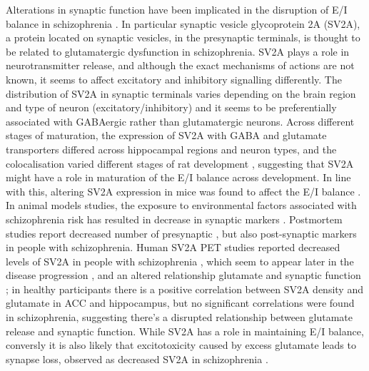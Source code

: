 \documentclass[
  letterpaper,
  DIV=11,
  numbers=noendperiod]{scrartcl}
\begin{document}
Alterations in synaptic function have been implicated in the disruption
of E/I balance in schizophrenia \autocite{howes_synaptic_2023}. In
particular synaptic vesicle glycoprotein 2A (SV2A), a protein located on
synaptic vesicles, in the presynaptic terminals, is thought to be
related to glutamatergic dysfunction in schizophrenia. SV2A plays a role
in neurotransmitter release, and although the exact mechanisms of
actions are not known, it seems to affect excitatory and inhibitory
signalling differently. The distribution of SV2A in synaptic terminals
varies depending on the brain region and type of neuron
(excitatory/inhibitory)\autocite{vanoye-carlo_differential_2019,wong_sv2a_2024}
and it seems to be preferentially associated with GABAergic rather than
glutamatergic neurons\autocite{mendoza-torreblanca_analysis_2019}.
Across different stages of maturation, the expression of SV2A with GABA
and glutamate transporters differed across hippocampal regions and
neuron types, and the colocalisation varied different stages of rat
development \autocite{vanoye-carlo_differential_2019}, suggesting that
SV2A might have a role in maturation of the E/I balance across
development. In line with this, altering SV2A expression in mice was
found to affect the E/I balance \autocite{venkatesan_altered_2012}. In
animal models studies, the exposure to environmental factors associated
with schizophrenia risk has resulted in decrease in synaptic markers
\autocite{silva-gomez_decreased_2003}. Postmortem studies report
decreased number of presynaptic \autocite{osimo_synaptic_2019}, but also
post-synaptic \autocite{berdenisvanberlekom_synapse_2019} markers in
people with schizophrenia. Human SV2A PET studies reported decreased
levels of SV2A in people with schizophrenia
\autocite{radhakrishnan_vivo_2021,onwordi_synaptic_2020}, which seem to
appear later in the disease progression
\autocite{onwordi_synaptic_2024}, and an altered relationship glutamate
and synaptic function \autocite{onwordi_relationship_2021}; in healthy
participants there is a positive correlation between SV2A density and
glutamate in ACC and hippocampus, but no significant correlations were
found in schizophrenia\autocite{onwordi_relationship_2021}, suggesting
there's a disrupted relationship between glutamate release and synaptic
function. While SV2A has a role in maintaining E/I balance, conversly it
is also likely that excitotoxicity caused by excess glutamate leads to
synapse loss, observed as decreased SV2A in schizophrenia
\autocite{glantz_apoptotic_2006}.
\end{document}
